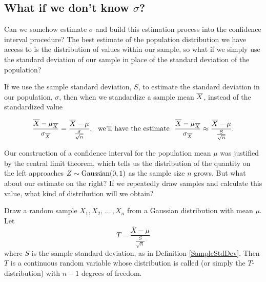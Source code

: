 \subsection*{What if we don't know $\sigma$?}

Can we somehow estimate $\sigma$ and build this estimation process into the confidence interval procedure? The best estimate of the population distribution we have access to is the distribution of values within our sample, so what if we simply use the standard deviation of our sample in place of the standard deviation of the population?

If we use the sample standard deviation, $S$, to estimate the standard deviation in our population, $\sigma$, then when we standardize a sample mean ${\overline{X}}$, instead of the standardized value

$$\frac{\overline{X} - \muxbar}{\sigmaxbar} = \frac{\overline{X} - \mu}{\frac{\sigma}{\sqrt{n}}}, \ \ \text{we'll have the estimate} \ \ \frac{\overline{X} - \muxbar}{\sigmaxbar} \approx \frac{\overline{X} - \mu}{\frac{S}{\sqrt{n}}}.$$

Our construction of a confidence interval for the population mean $\mu$ was justified by the central limit theorem, which tells us the distribution of the quantity on the left approaches $Z \sim \operatorname{Gaussian}(0,1)$ as the sample size $n$ grows. But what about our estimate on the right? If we repeatedly draw samples and calculate this value, what kind of distribution will we obtain?

\begin{definition}\label{TDistDef} Draw a random sample $X_1, X_2, \, \dots \, , X_n$ from a Gaussian distribution with mean $\mu$. Let
$$T = \frac{\overline{X} - \mu}{\frac{S}{\sqrt{n}}}$$
where $S$ is the sample standard deviation, as in Definition \ref{SampleStdDev}. Then $T$ is a continuous random variable whose distribution is called  (or simply the $T$-distribution) with $n-1$ degrees of freedom.
\end{definition}
\begin{center}
\end{center}

